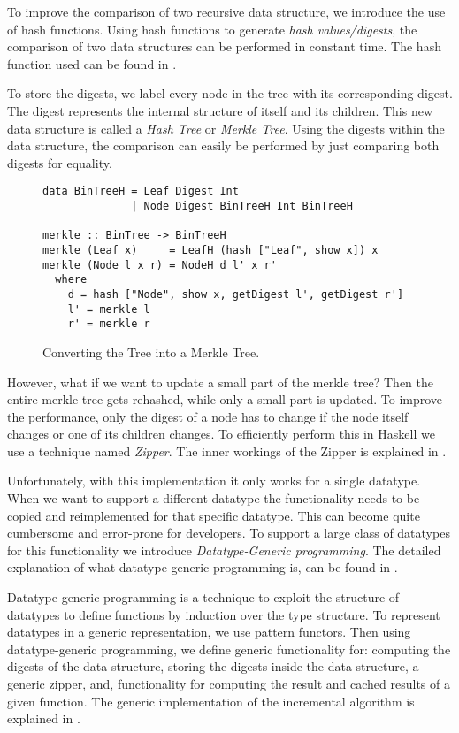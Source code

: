 To improve the comparison of two recursive data structure, we introduce the use of hash functions. Using hash functions to generate \textit{hash values/digests}, the comparison of two data structures can be performed in constant time. The hash function used can be found in .

To store the digests, we label every node in the tree with its corresponding digest. The digest represents the internal structure of itself and its children. This new data structure is called a \textit{Hash Tree} or \textit{Merkle Tree}\cite{merkle1987digital}. Using the digests within the data structure, the comparison can easily be performed by just comparing both digests for equality.

\begin{figure}[H]
\captionsetup{justification=justified,singlelinecheck=false,margin=0cm}
\begin{verbatim}
data BinTreeH = Leaf Digest Int
              | Node Digest BinTreeH Int BinTreeH

merkle :: BinTree -> BinTreeH
merkle (Leaf x)     = LeafH (hash ["Leaf", show x]) x
merkle (Node l x r) = NodeH d l' x r'
  where
    d = hash ["Node", show x, getDigest l', getDigest r']
    l' = merkle l
    r' = merkle r
\end{verbatim}
\caption{Converting the Tree into a Merkle Tree.}
\label{fig-conv-tree}
\end{figure}

However, what if we want to update a small part of the merkle tree? Then the entire merkle tree gets rehashed, while only a small part is updated. To improve the performance, only the digest of a node has to change if the node itself changes or one of its children changes. To efficiently perform this in Haskell we use a technique named \textit{Zipper}\cite{huet1997zipper}. The inner workings of the Zipper is explained in .

Unfortunately, with this implementation it only works for a single datatype. When we want to support a different datatype the functionality needs to be copied and reimplemented for that specific datatype. This can become quite cumbersome and error-prone for developers. To support a large class of datatypes for this functionality we introduce \textit{Datatype-Generic programming}. The detailed explanation of what datatype-generic programming is, can be found in .

Datatype-generic programming is a technique to exploit the structure of datatypes to define functions by induction over the type structure. To represent datatypes in a generic representation, we use pattern functors. Then using datatype-generic programming, we define generic functionality for: computing the digests of the data structure, storing the digests inside the data structure, a generic zipper, and, functionality for computing the result and cached results of a given function. The generic implementation of the incremental algorithm is explained in .

